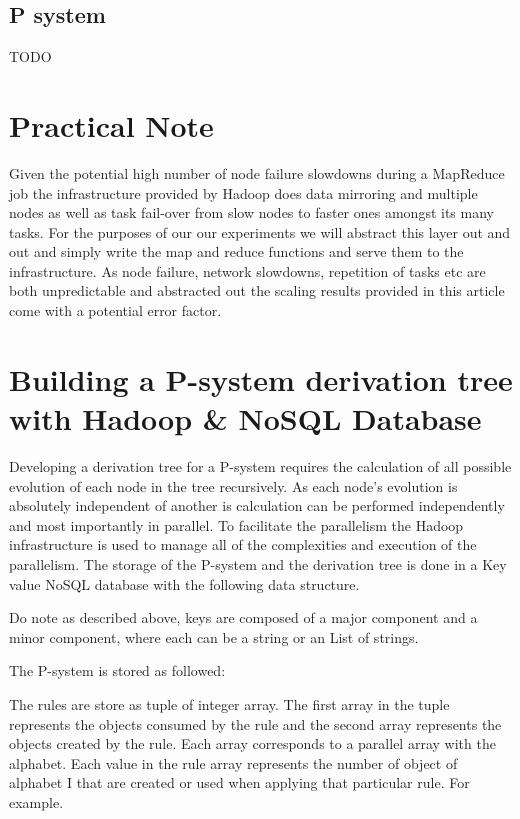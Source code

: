 \documentclass[runningheads]{llncs}
\begin{document}
\subsection*{P system}

TODO

\section{Practical Note}

Given the potential high number of node failure slowdowns during a MapReduce job the infrastructure provided by Hadoop does data mirroring and multiple nodes as well as task fail-over from slow nodes to faster ones amongst its many tasks. For the purposes of our our experiments we will abstract this layer out and out and simply write the map and reduce functions and serve them to the infrastructure. As node failure, network slowdowns, repetition of tasks etc are both unpredictable and abstracted out the scaling results provided in this article come with a potential error factor.

\section{Building a P-system derivation tree with Hadoop \& NoSQL Database}

Developing a derivation tree for a P-system requires the calculation of all possible evolution of each node in the tree recursively. As each node's evolution is absolutely independent of another is calculation can be performed independently and most importantly in parallel. To facilitate the parallelism the Hadoop infrastructure is used to manage all of the complexities and execution of the parallelism. The storage of the P-system and the derivation tree is done in a Key value NoSQL database with the following data structure. 

Do note as described above, keys  are composed of a major component and a minor component, where each can be a string or an List of strings.

The P-system is stored as followed:

The rules are store as tuple of integer array. The first array in the tuple represents the objects consumed by the rule and the second array represents the objects created by the rule. Each array corresponds to a parallel array with the alphabet. Each value in the rule array represents the number of object of alphabet  I that are created or used when applying that particular rule. For example. 
\end{document}
